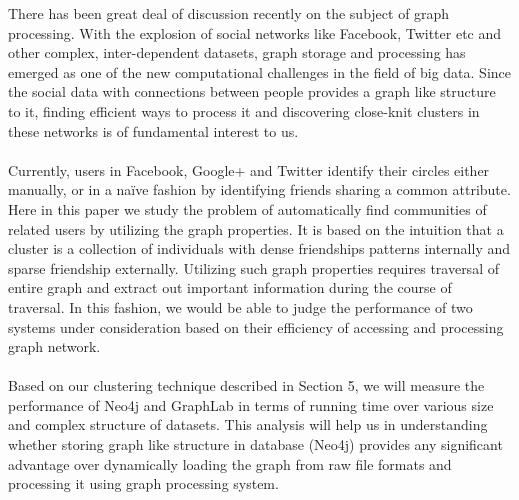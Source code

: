 \documentclass[11pt,onecolumn]{article}
\begin{document}
There has been great deal of discussion recently on the subject of graph processing. With the explosion of social networks like Facebook, Twitter etc and other complex, inter-dependent datasets, graph storage and processing has emerged as one of the new computational challenges in the field of big data. Since the social data with connections between people provides a graph like structure to it, finding efficient ways to process it and discovering close-knit clusters in these networks is of fundamental interest to us.
\\\\
Currently, users in Facebook, Google+ and Twitter identify their circles either manually, or in a naïve fashion by identifying friends sharing a common attribute. Here in this paper we study the problem of automatically find communities of related users by utilizing the graph properties. It is based on the intuition that a cluster is a collection of individuals with dense friendships patterns internally and sparse friendship externally. Utilizing such graph properties requires traversal of entire graph and extract out important information during the course of traversal. In this fashion, we would be able to judge the performance of two systems under consideration based on their efficiency of accessing and processing graph network. 
\\\\
Based on our clustering technique described in Section 5, we will measure the performance of Neo4j and GraphLab in terms of running time over various size and complex structure of datasets. This analysis will help us in understanding whether storing graph like structure in database (Neo4j) provides any significant advantage over dynamically loading the graph from raw file formats and processing it using graph processing system.
\end{document}
